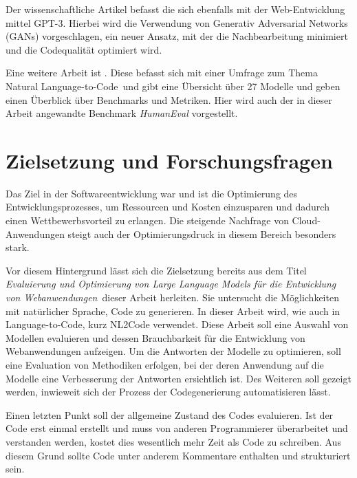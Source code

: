 Der wissenschaftliche Artikel \cite{nataraj-2024} befasst die sich ebenfalls mit der Web-Entwicklung mittel GPT-3. Hierbei wird die Verwendung von Generativ Adversarial Networks (GANs) vorgeschlagen, ein neuer Ansatz, mit der die Nachbearbeitung minimiert und die Codequalität optimiert wird.\vspace{0.2cm}

Eine weitere Arbeit ist \cite{zan-2022}. Diese befasst sich mit einer Umfrage zum Thema \glqq Natural Language-to-Code\grqq \ und gibt eine Übersicht über 27 Modelle und geben einen Überblick über Benchmarks und Metriken. Hier wird auch der in dieser Arbeit angewandte Benchmark \textit{HumanEval} vorgestellt.

\section{Zielsetzung und Forschungsfragen}
Das Ziel in der Softwareentwicklung war und ist die Optimierung des Entwicklungsprozesses, um Ressourcen und Kosten einzusparen und dadurch einen Wettbewerbsvorteil zu erlangen. Die steigende Nachfrage von Cloud-Anwendungen steigt auch der Optimierungsdruck in diesem Bereich besonders stark.\vspace{0.2cm}

Vor diesem Hintergrund lässt sich die Zielsetzung bereits aus dem Titel \glqq \textit{Evaluierung und Optimierung von Large Language Models für die Entwicklung von Webanwendungen}\grqq \ dieser Arbeit herleiten. Sie untersucht die Möglichkeiten mit natürlicher Sprache, Code zu generieren. In dieser Arbeit wird, wie auch in \cite[vgl. Seite 2]{jiang-2024} Language-to-Code, kurz NL2Code verwendet. Diese Arbeit soll eine Auswahl von Modellen evaluieren und dessen Brauchbarkeit für die Entwicklung von Webanwendungen aufzeigen. Um die Antworten der Modelle zu optimieren, soll eine Evaluation von Methodiken erfolgen, bei der deren Anwendung auf die Modelle eine Verbesserung der Antworten ersichtlich ist. Des Weiteren soll gezeigt werden, inwieweit sich der Prozess der Codegenerierung automatisieren lässt.\vspace{0.2cm}

Einen letzten Punkt soll der allgemeine Zustand des Codes evaluieren. Ist der Code erst einmal erstellt und muss von anderen Programmierer überarbeitet und verstanden werden, kostet dies wesentlich mehr Zeit als Code zu schreiben. Aus diesem Grund sollte Code unter anderem Kommentare enthalten und strukturiert sein.\vspace{0.2cm}

